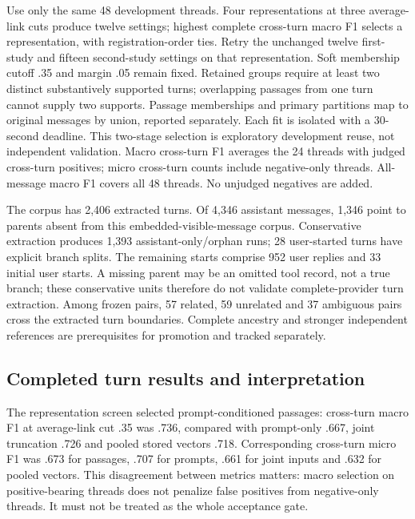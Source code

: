 \documentclass[11pt]{article}
\begin{document}
Use only the same 48 development threads. Four representations at three
average-link cuts produce twelve settings; highest complete cross-turn macro F1
selects a representation, with registration-order ties. Retry the unchanged
twelve first-study and fifteen second-study settings on that representation.
Soft membership cutoff .35 and margin .05 remain fixed. Retained groups require
at least two distinct substantively supported turns; overlapping passages from
one turn cannot supply two supports. Passage memberships and primary partitions
map to original messages by union, reported separately. Each fit is isolated with
a 30-second deadline. This two-stage selection is exploratory development reuse,
not independent validation. Macro cross-turn F1 averages the 24 threads with
judged cross-turn positives; micro cross-turn counts include negative-only
threads. All-message macro F1 covers all 48 threads. No unjudged negatives are added.

The corpus has 2,406 extracted turns. Of 4,346 assistant messages, 1,346 point
to parents absent from this embedded-visible-message corpus. Conservative extraction
produces 1,393 assistant-only/orphan runs; 28 user-started turns have explicit
branch splits. The remaining starts comprise 952 user replies and 33 initial
user starts. A missing parent may be an omitted tool record, not a true branch;
these conservative units therefore do not validate complete-provider turn extraction.
Among frozen pairs, 57 related, 59 unrelated and 37 ambiguous pairs cross the
extracted turn boundaries. Complete ancestry and stronger independent references
are prerequisites for promotion and tracked separately.

\subsection{Completed turn results and interpretation}
The representation screen selected prompt-conditioned passages: cross-turn
macro F1 at average-link cut .35 was .736, compared with prompt-only .667,
joint truncation .726 and pooled stored vectors .718. Corresponding cross-turn
micro F1 was .673 for passages, .707 for prompts, .661 for joint inputs and
.632 for pooled vectors. This disagreement
between metrics matters: macro selection on positive-bearing threads does not
penalize false positives from negative-only threads. It must not be treated as
the whole acceptance gate.
\end{document}
